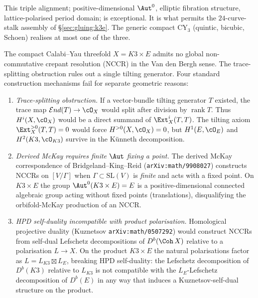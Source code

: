 This triple alignment; positive-dimensional $\Aut^0$, elliptic
fibration structure, lattice-polarised period domain; is exceptional.
It is what permits the $24$-curve-stalk assembly of \S\ref{sec:gluing:k3e}. The
generic compact CY$_3$ (quintic, bicubic, Schoen) realises at most one
of the three.

\begin{proposition}
\label{prop:k3e-five-obstructions}
The compact Calabi--Yau threefold $X = K3 \times E$ admits no global
non-commutative crepant resolution (NCCR) in the Van den Bergh sense.
The trace-splitting obstruction rules out a single tilting generator.
Four standard construction mechanisms fail for separate geometric
reasons:

\begin{enumerate}[label=\emph{(\alph*)}, leftmargin=2.5em]
\item \emph{Trace-splitting obstruction.} If a vector-bundle tilting
generator $T$ existed, the trace map
$\mathcal End(T)\to\cO_X$ would split after division by
$\operatorname{rank}T$. Thus $H^i(X,\cO_X)$ would be a direct summand
of $\Ext^i_X(T,T)$. The tilting axiom $\Ext_X^{>0}(T,T)=0$ would force
$H^{>0}(X,\cO_X)=0$, but $H^1(E,\cO_E)$ and $H^2(K3,\cO_{K3})$ survive
in the K\"unneth decomposition.

\item \emph{Derived McKay requires finite $\Aut$ fixing a point.}
The derived McKay correspondence of Bridgeland--King--Reid
(\texttt{arXiv:math/9908027}) constructs NCCRs on $[V/\Gamma]$ when
$\Gamma \subset \mathrm{SL}(V)$ is \emph{finite} and acts with a fixed
point. On $K3\times E$ the group $\Aut^0(K3\times E) = E$ is a
positive-dimensional connected algebraic group acting without fixed
points (translations), disqualifying the orbifold-McKay production of
an NCCR.

\item \emph{HPD self-duality incompatible with product polarisation.}
Homological projective duality (Kuznetsov \texttt{arXiv:math/0507292})
would construct NCCRs from self-dual Lefschetz decompositions of
$D^b(\Coh\,X)$ relative to a polarisation $L \to X$. On the product
$K3 \times E$ the natural polarisations factor as
$L = L_{K3} \boxtimes L_E$, breaking HPD self-duality: the Lefschetz
decomposition of $D^b(K3)$ relative to $L_{K3}$ is not compatible with
the $L_E$-Lefschetz decomposition of $D^b(E)$ in any way that induces
a Kuznetsov-self-dual structure on the product.


\end{enumerate}
\end{proposition}
